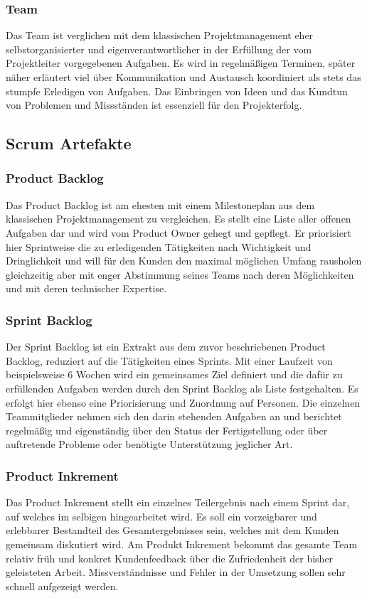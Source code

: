\subsubsection{Team}
Das Team ist verglichen mit dem klassischen Projektmanagement eher selbstorganisierter und eigenverantwortlicher in der Erfüllung der vom Projektleiter vorgegebenen Aufgaben. Es wird in regelmäßigen Terminen, später näher erläutert viel über Kommunikation und Austausch koordiniert als stets das stumpfe Erledigen von Aufgaben. Das Einbringen von Ideen und das Kundtun von Problemen und Missständen ist essenziell für den Projekterfolg. 


\subsection{Scrum Artefakte}
\subsubsection{Product Backlog}
Das Product Backlog ist am ehesten mit einem Milestoneplan aus dem klassischen Projektmanagement zu vergleichen. Es stellt eine Liste aller offenen Aufgaben dar und wird vom Product Owner gehegt und gepflegt. Er priorisiert hier Sprintweise die zu erledigenden Tätigkeiten nach Wichtigkeit und Dringlichkeit und will für den Kunden den maximal möglichen Umfang rausholen gleichzeitig aber mit enger Abstimmung seines Teams nach deren Möglichkeiten und mit deren technischer Expertise.

\subsubsection{Sprint Backlog}
Der Sprint Backlog ist ein Extrakt aus dem zuvor beschriebenen Product Backlog, reduziert auf die Tätigkeiten eines Sprints. Mit einer Laufzeit von beispielsweise 6 Wochen wird ein gemeinsames Ziel definiert und die dafür zu erfüllenden Aufgaben werden durch den Sprint Backlog als Liste festgehalten. Es erfolgt hier ebenso eine Priorisierung und Zuordnung auf Personen. Die einzelnen Teammitglieder nehmen sich den darin stehenden Aufgaben an und berichtet regelmäßig und eigenständig über den Status der Fertigstellung oder über auftretende Probleme oder benötigte Unterstützung jeglicher Art.

\subsubsection{Product Inkrement}
Das Product Inkrement stellt ein einzelnes Teilergebnis nach einem Sprint dar, auf welches im selbigen hingearbeitet wird. Es soll ein vorzeigbarer und erlebbarer Bestandteil des Gesamtergebnisses sein, welches mit dem Kunden gemeinsam diskutiert wird. Am Produkt Inkrement bekommt das gesamte Team relativ früh und konkret Kundenfeedback über die Zufriedenheit der bisher geleisteten Arbeit. Missverständnisse und Fehler in der Umsetzung sollen sehr schnell aufgezeigt werden.

